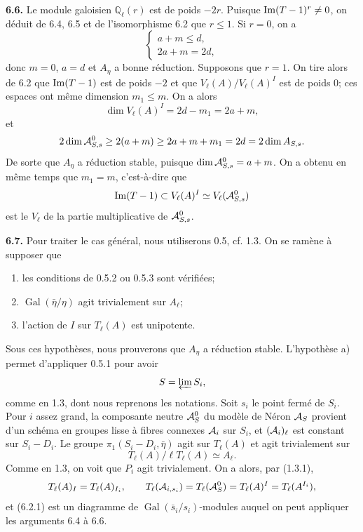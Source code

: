 \documentclass[11pt]{article}
\providecommand{\Gal}{\operatorname{Gal}}
\providecommand{\Ql}{\mathbb Q_\ell}
\providecommand{\limproj}{\varprojlim}
\begin{document}
\textbf{6.6.} Le module galoisien $\Ql(r)$ est de poids $-2r$. Puisque $\operatorname{Im}(T-1)^r\ne0$, on déduit de 6.4, 6.5 et de l'isomorphisme 6.2 que $r\le1$. Si $r=0$, on a
\[
\begin{cases}
 a+m\le d,\\
 2a+m=2d,
\end{cases}
\]
donc $m=0$, $a=d$ et $A_\eta$ a bonne réduction. Supposons que $r=1$. On tire alors de 6.2 que $\operatorname{Im}(T-1)$ est de poids $-2$ et que $V_\ell(A)/V_\ell(A)^I$ est de poids $0$; ces espaces ont même dimension $m_1\le m$. On a alors
\[
 \dim V_\ell(A)^I=2d-m_1=2a+m,
\]
et
\[
 2\dim \mathcal A^0_{S,s}\ge 2(a+m)
 \ge 2a+m+m_1=2d=2\dim A_{S,s}.
\]
De sorte que $A_\eta$ a réduction stable, puisque $\dim \mathcal A^0_{S,s}=a+m$. On a obtenu en même temps que $m_1=m$, c'est-à-dire que
\[
 \operatorname{Im}(T-1)\subset V_\ell(A)^I\simeq V_\ell(\mathcal A^0_{S,s})
\]
est le $V_\ell$ de la partie multiplicative de $\mathcal A^0_{S,s}$.

\textbf{6.7.} Pour traiter le cas général, nous utiliserons 0.5, cf. 1.3. On se ramène à supposer que
\begin{enumerate}[label=\alph*)]
\item les conditions de 0.5.2 ou 0.5.3 sont vérifiées;
\item $\Gal(\bar\eta/\eta)$ agit trivialement sur $A_\ell$;
\item l'action de $I$ sur $T_\ell(A)$ est unipotente.
\end{enumerate}
Sous ces hypothèses, nous prouverons que $A_\eta$ a réduction stable. L'hypothèse a) permet d'appliquer 0.5.1 pour avoir
\[
 S=\limproj S_i,
\]
comme en 1.3, dont nous reprenons les notations. Soit $s_i$ le point fermé de $S_i$. Pour $i$ assez grand, la composante neutre $\mathcal A^0_S$ du modèle de Néron $\mathcal A_S$ provient d'un schéma en groupes lisse à fibres connexes $\mathcal A_i$ sur $S_i$, et $(\mathcal A_i)_\ell$ est constant sur $S_i-D_i$. Le groupe $\pi_1(S_i-D_i,\bar\eta)$ agit sur $T_\ell(A)$ et agit trivialement sur
\[
 T_\ell(A)/\ell T_\ell(A)\simeq A_\ell.
\]
Comme en 1.3, on voit que $P_i$ agit trivialement. On a alors, par (1.3.1),
\[
 T_\ell(A)_I=T_\ell(A)_{I_i},
 \qquad
 T_\ell(\mathcal A_{i,s_i})=T_\ell(\mathcal A^0_S)=T_\ell(A)^I=T_\ell(A^{I_i}),
\]
et (6.2.1) est un diagramme de $\Gal(\bar s_i/s_i)$-modules auquel on peut appliquer les arguments 6.4 à 6.6.
\end{document}
